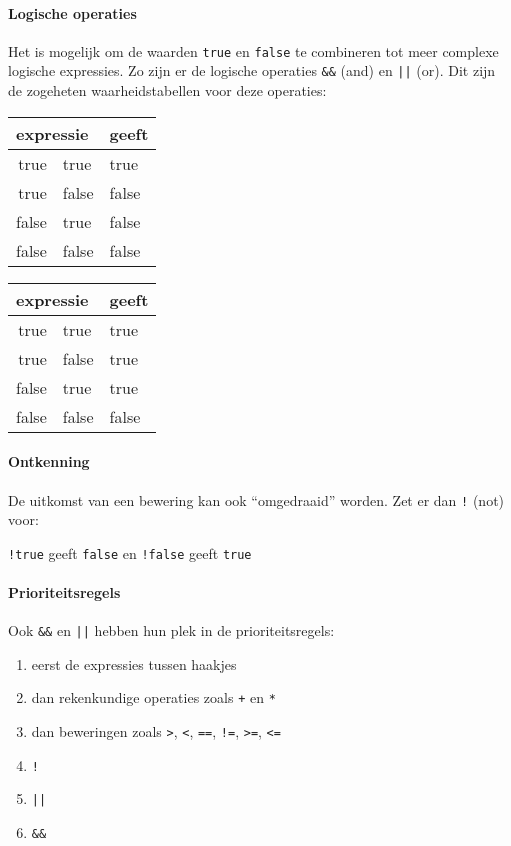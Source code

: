 \paragraph{Logische operaties}

Het is mogelijk om de waarden \texttt{true} en \texttt{false} te combineren tot meer complexe logische expressies. Zo zijn er de logische operaties \texttt{\&\&} (and) en \texttt{||} (or). Dit zijn de zogeheten waarheidstabellen voor deze operaties:

\begin{center}
  \ttfamily
  \begin{tabular}{r@{ \&\& }l@{\qquad}l}
    \multicolumn{2}{l}{\normalfont expressie} & {\normalfont geeft} \\
    \midrule
    true & true   & true \\
    true & false & false \\
    false & true  & false \\
    false & false  & false \\
    \midrule
  \end{tabular}
  \qquad
  \begin{tabular}{r@{ || }l@{\qquad}l}
    \multicolumn{2}{l}{\normalfont expressie} & {\normalfont geeft} \\
    \midrule
    true  & true   & true \\
    true  & false  & true \\
    false & true   & true \\
    false & false  & false \\
    \midrule
  \end{tabular}
\end{center}

\paragraph{Ontkenning}

De uitkomst van een bewering kan ook ``omgedraaid'' worden. Zet er dan \texttt{!} (not) voor:

\begin{center}
  \texttt{!true} \quad  geeft \quad  \texttt{false} \qquad  en \qquad  \texttt{!false} \quad geeft \quad \texttt{true}
\end{center}

\paragraph{Prioriteitsregels}

Ook \texttt{\&\&} en \texttt{||} hebben hun plek in de prioriteitsregels:

\begin{enumerate}
  \item eerst de expressies tussen haakjes
  \item dan rekenkundige operaties zoals \texttt{+} en \texttt{*}
  \item dan beweringen zoals \texttt{>}, \texttt{<}, \texttt{==}, \texttt{!=}, \texttt{>=}, \texttt{<=}
  \item \texttt{!}
  \item \texttt{||}
  \item \texttt{\&\&}
\end{enumerate}
